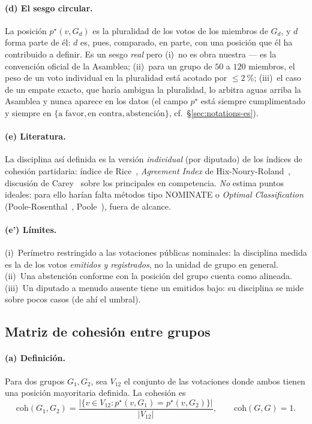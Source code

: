 \paragraph{(d) El \og{}sesgo circular\fg{}.} La posición $p^\star(v,G_d)$ es la
pluralidad de los votos de los miembros de $G_d$, y $d$ forma parte de él: $d$ es,
pues, comparado, en parte, con una posición que él ha contribuido a definir. Es un
sesgo \emph{real} pero (i)~no es obra nuestra — es la convención oficial de la
Asamblea; (ii)~para un grupo de $50$ a $120$ miembros, el peso de un voto individual
en la pluralidad está acotado por $\le 2~\%$; (iii)~el caso de un empate exacto, que
haría ambigua la pluralidad, lo arbitra aguas arriba la Asamblea y nunca aparece en
los datos (el campo $p^\star$ está siempre cumplimentado y siempre en
$\{\text{a favor},\text{en contra},\text{abstención}\}$, cf.~§\ref{sec:notations-es}).

\paragraph{(e) Literatura.} La disciplina así definida es la versión
\emph{individual} (por diputado) de los índices de cohesión partidaria: índice de
Rice~\cite{rice1925}, \emph{Agreement Index} de Hix-Noury-Roland~\cite{hnr2005,hnr2007},
discusión de Carey~\cite{carey2007} sobre los \og{}principales en competencia\fg{}.
\emph{No} estima puntos ideales: para ello harían falta métodos tipo NOMINATE o
\emph{Optimal Classification} (Poole-Rosenthal~\cite{pr1997}, Poole~\cite{poole2005}),
fuera de alcance.

\paragraph{(e') Límites.} (i)~Perímetro restringido a las votaciones públicas
nominales: la \og{}disciplina\fg{} medida es la de los votos \emph{emitidos y
registrados}, no la unidad de grupo en general. (ii)~Una abstención conforme con la
posición del grupo cuenta como \og{}alineada\fg{}. (iii)~Un diputado a menudo
ausente tiene un $\mathrm{emitidos}$ bajo: su disciplina se mide sobre pocos casos
(de ahí el umbral).

\subsection{Matriz de cohesión entre grupos}\label{sec:matrice-es}

\paragraph{(a) Definición.} Para dos grupos $G_1,G_2$, sea $V_{12}$ el conjunto de
las votaciones donde ambos tienen una posición mayoritaria definida. La cohesión es
\[
\mathrm{coh}(G_1,G_2)=\frac{\big|\{v\in V_{12}:p^\star(v,G_1)=p^\star(v,G_2)\}\big|}{|V_{12}|},
\qquad \mathrm{coh}(G,G)=1.
\]

